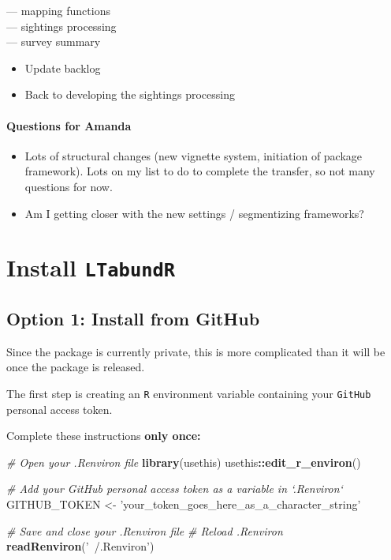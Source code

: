 \documentclass[
]{book}
\newenvironment{Shaded}{\begin{snugshade}}{\end{snugshade}}
\newcommand{\CommentTok}[1]{\textcolor[rgb]{0.56,0.35,0.01}{\textit{#1}}}
\newcommand{\KeywordTok}[1]{\textcolor[rgb]{0.13,0.29,0.53}{\textbf{#1}}}
\newcommand{\NormalTok}[1]{#1}
\newcommand{\OperatorTok}[1]{\textcolor[rgb]{0.81,0.36,0.00}{\textbf{#1}}}
\newcommand{\StringTok}[1]{\textcolor[rgb]{0.31,0.60,0.02}{#1}}
\begin{document}
--- mapping functions\\
--- sightings processing\\
--- survey summary

\begin{itemize}
\item
  Update backlog
\item
  Back to developing the sightings processing
\end{itemize}

\hypertarget{questions-for-amanda}{%
\subsubsection*{Questions for Amanda}\label{questions-for-amanda}}

\begin{itemize}
\item
  Lots of structural changes (new vignette system, initiation of package framework). Lots on my list to do to complete the transfer, so not many questions for now.
\item
  Am I getting closer with the new settings / segmentizing frameworks?
\end{itemize}

\hypertarget{install}{%
\chapter{\texorpdfstring{Install \texttt{LTabundR}}{Install LTabundR}}\label{install}}

\hypertarget{option-1-install-from-github}{%
\section*{Option 1: Install from GitHub}\label{option-1-install-from-github}}

Since the package is currently private, this is more complicated than it will be once the package is released.

The first step is creating an \texttt{R} environment variable containing your \texttt{GitHub} personal access token.

Complete these instructions \textbf{only once:}

\begin{Shaded}
\begin{Highlighting}[]
\CommentTok{# Open your .Renviron file}
\KeywordTok{library}\NormalTok{(usethis)}
\NormalTok{usethis}\OperatorTok{::}\KeywordTok{edit_r_environ}\NormalTok{()}

\CommentTok{# Add your GitHub personal access token as a variable in `.Renviron`}
\NormalTok{GITHUB_TOKEN <-}\StringTok{ 'your_token_goes_here_as_a_character_string'}

\CommentTok{# Save and close your .Renviron file}
\CommentTok{# Reload .Renviron}
\KeywordTok{readRenviron}\NormalTok{(}\StringTok{'~/.Renviron'}\NormalTok{)}
\end{Highlighting}
\end{Shaded}
\end{document}
